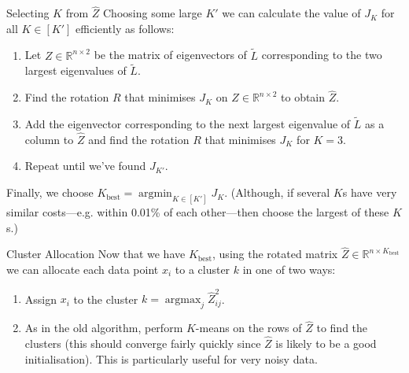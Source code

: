 \documentclass[aspectratio=169]{beamer}
\DeclareMathOperator*{\argmax}{argmax} %
\DeclareMathOperator*{\argmin}{argmin}
\begin{document}
\begin{frame}{Selecting $K$ from $\hat{Z}$}
  Choosing some large $K'$ we can calculate the value of $J_K$ for all $K \in [K']$ efficiently as follows:
  \pause
  \begin{enumerate}
    \item Let $Z \in \mathbb{R}^{n \times 2}$ be the matrix of eigenvectors of $\tilde{L}$ corresponding to the two largest eigenvalues of $\tilde{L}$.
    \pause\item Find the rotation $R$ that minimises $J_K$ on $Z \in \mathbb{R}^{n \times 2}$ to obtain $\hat{Z}$.
    \pause\item Add the eigenvector corresponding to the next largest eigenvalue of $\tilde{L}$ as a column to $\hat{Z}$ and find the rotation $R$ that minimises $J_K$ for $K = 3$.
    \pause\item Repeat until we've found $J_{K'}$.
  \end{enumerate}
  \pause
  Finally, we choose $K_{\text{best}} = \argmin_{K \in [K']} J_K$.
  (Although, if several $K$s have very similar costs---e.g. within 0.01\% of each other---then choose the largest of these $K$s.)

  \end{frame}

\begin{frame}{Cluster Allocation}
  Now that we have $K_{\text{best}}$, using the rotated matrix $\hat{Z} \in \mathbb{R}^{n \times K_{\text{best}}}$ we can allocate each data point $x_i$ to a cluster $k$ in one of two ways: 
  \pause 
  \begin{enumerate}[<+->]
    \item Assign $x_i$ to the cluster $k = \argmax_j \hat{Z}_{ij}^2$.
    \item As in the old algorithm, perform $K$-means on the rows of $\hat{Z}$ to find the clusters (this should converge fairly quickly since $\hat{Z}$ is likely to be a good initialisation).
    This is particularly useful for very noisy data.
  \end{enumerate}
\end{frame}
\end{document}
